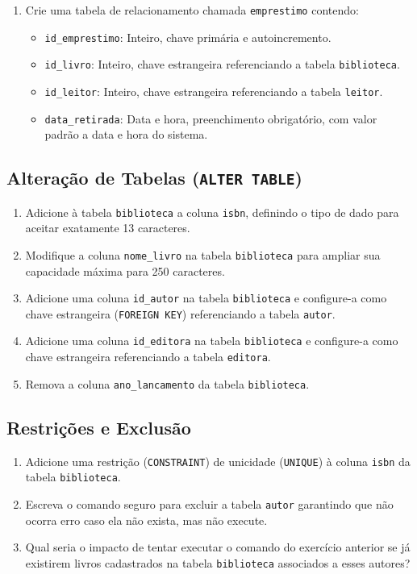 \begin{enumerate}
    \item Crie uma tabela de relacionamento chamada \texttt{emprestimo} contendo:
    \begin{itemize}
        \item \texttt{id\_emprestimo}: Inteiro, chave primária e autoincremento.
        \item \texttt{id\_livro}: Inteiro, chave estrangeira referenciando a tabela \texttt{biblioteca}.
        \item \texttt{id\_leitor}: Inteiro, chave estrangeira referenciando a tabela \texttt{leitor}.
        \item \texttt{data\_retirada}: Data e hora, preenchimento obrigatório, com valor padrão a data e hora do sistema.
    \end{itemize}
\end{enumerate}

\subsection{Alteração de Tabelas (\texttt{ALTER TABLE})}
\begin{enumerate}
    \item Adicione à tabela \texttt{biblioteca} a coluna \texttt{isbn}, definindo o tipo de dado para aceitar exatamente 13 caracteres.
    \item Modifique a coluna \texttt{nome\_livro} na tabela \texttt{biblioteca} para ampliar sua capacidade máxima para 250 caracteres.
    \item Adicione uma coluna \texttt{id\_autor} na tabela \texttt{biblioteca} e configure-a como chave estrangeira (\texttt{FOREIGN KEY}) referenciando a tabela \texttt{autor}.
    \item Adicione uma coluna \texttt{id\_editora} na tabela \texttt{biblioteca} e configure-a como chave estrangeira referenciando a tabela \texttt{editora}.
    \item Remova a coluna \texttt{ano\_lancamento} da tabela \texttt{biblioteca}.
\end{enumerate}

\subsection{Restrições e Exclusão}
\begin{enumerate}
    \item Adicione uma restrição (\texttt{CONSTRAINT}) de unicidade (\texttt{UNIQUE}) à coluna \texttt{isbn} da tabela \texttt{biblioteca}.
    \item Escreva o comando seguro para excluir a tabela \texttt{autor} garantindo que não ocorra erro caso ela não exista, mas não execute.
    \item Qual seria o impacto de tentar executar o comando do exercício anterior se já existirem livros cadastrados na tabela \texttt{biblioteca} associados a esses autores?
\end{enumerate}


